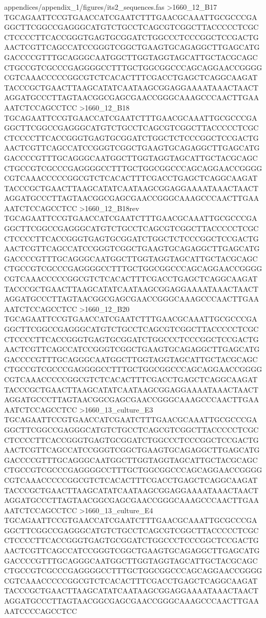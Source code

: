 {\begin{filecontents*}{appendices/appendix_1/figures/its2_sequences.fas}
>1660_12_B17
TGCAGAATTCCGTGAACCATCGAATCTTTGAACGCAAATTGCGCCCGAGGCTTCGGCCGAGGGCATGTCTGCCTCAGCGTCGGCTTACCCCCTCGCCTCCCCTTCACCGGGTGAGTGCGGATCTGGCCCTCCCGGCTCCGACTGAACTCGTTCAGCCATCCGGGTCGGCTGAAGTGCAGAGGCTTGAGCATGGACCCCGTTTGCAGGGCAATGGCTTGGTAGGTAGCATTGCTACGCAGCCTGCCGTCGCCCGAGGGGCCTTTGCTGGCGGCCCAGCAGGAACCGGGGCGTCAAACCCCCGGCGTCTCACACTTTCGACCTGAGCTCAGGCAAGATTACCCGCTGAACTTAAGCATATCAATAAGCGGAGGAAAATAAACTAACTAGGATGCCCTTAGTAACGGCGAGCGAACCGGGCAAAGCCCAACTTGAAAATCTCCAGCCTCC
>1660_12_B18
TGCAGAATTCCGTGAACCATCGAATCTTTGAACGCAAATTGCGCCCGAGGCTTCGGCCGAGGGCATGTCTGCCTCAGCGTCGGCTTACCCCCTCGCCTCCCCTTCACCGGGTGAGTGCGGATCTGGCTCTCCCGGCTCCGACTGAACTCGTTCAGCCATCCGGGTCGGCTGAAGTGCAGAGGCTTGAGCATGGACCCCGTTTGCAGGGCAATGGCTTGGTAGGTAGCATTGCTACGCAGCCTGCCGTCGCCCGAGGGGCCTTTGCTGGCGGCCCAGCAGGAACCGGGGCGTCAAACCCCCGGCGTCTCACACTTTCGACCTGAGCTCAGGCAAGATTACCCGCTGAACTTAAGCATATCAATAAGCGGAGGAAAATAAACTAACTAGGATGCCCTTAGTAACGGCGAGCGAACCGGGCAAAGCCCAACTTGAAAATCTCCAGCCTCC
>1660_12_B18rev
TGCAGAATTCCGTGAACCATCGAATCTTTGAACGCAAATTGCGCCCGAGGCTTCGGCCGAGGGCATGTCTGCCTCAGCGTCGGCTTACCCCCTCGCCTCCCCTTCACCGGGTGAGTGCGGATCTGGCTCTCCCGGCTCCGACTGAACTCGTTCAGCCATCCGGGTCGGCTGAAGTGCAGAGGCTTGAGCATGGACCCCGTTTGCAGGGCAATGGCTTGGTAGGTAGCATTGCTACGCAGCCTGCCGTCGCCCGAGGGGCCTTTGCTGGCGGCCCAGCAGGAACCGGGGCGTCAAACCCCCGGCGTCTCACACTTTCGACCTGAGCTCAGGCAAGATTACCCGCTGAACTTAAGCATATCAATAAGCGGAGGAAAATAAACTAACTAGGATGCCCTTAGTAACGGCGAGCGAACCGGGCAAAGCCCAACTTGAAAATCTCCAGCCTCC
>1660_12_B20
TGCAGAATTCCGTGAACCATCGAATCTTTGAACGCAAATTGCGCCCGAGGCTTCGGCCGAGGGCATGTCTGCCTCAGCGTCGGCTTACCCCCTCGCCTCCCCTTCACCGGGTGAGTGCGGATCTGGCCCTCCCGGCTCCGACTGAACTCGTTCAGCCATCCGGGTCGGCTGAAGTGCAGAGGCTTGAGCATGGACCCCGTTTGCAGGGCAATGGCTTGGTAGGTAGCATTGCTACGCAGCCTGCCGTCGCCCGAGGGGCCTTTGCTGGCGGCCCAGCAGGAACCGGGGCGTCAAACCCCCGGCGTCTCACACTTTCGACCTGAGCTCAGGCAAGATTACCCGCTGAACTTAAGCATATCAATAAGCGGAGGAAAATAAACTAACTAGGATGCCCTTAGTAACGGCGAGCGAACCGGGCAAAGCCCAACTTGAAAATCTCCAGCCTCC
>1660_13_culture_E3
TGCAGAATTCCGTGAACCATCGAATCTTTGAACGCAAATTGCGCCCGAGGCTTCGGCCGAGGGCATGTCTGCCTCAGCGTCGGCTTACCCCCTCGCCTCCCCTTCACCGGGTGAGTGCGGATCTGGCCCTCCCGGCTCCGACTGAACTCGTTCAGCCATCCGGGTCGGCTGAAGTGCAGAGGCTTGAGCATGGACCCCGTTTGCAGGGCAATGGCTTGGTAGGTAGCATTGCTACGCAGCCTGCCGTCGCCCGAGGGGCCTTTGCTGGCGGCCCAGCAGGAACCGGGGCGTCAAACCCCCGGCGTCTCACACTTTCGACCTGAGCTCAGGCAAGATTACCCGCTGAACTTAAGCATATCAATAAGCGGAGGAAAATAAACTAACTAGGATGCCCTTAGTAACGGCGAGCGAACCGGGCAAAGCCCAACTTGAAAATCTCCAGCCTCC
>1660_13_culture_E4
TGCAGAATTCCGTGAACCATCGAATCTTTGAACGCAAATTGCGCCCGAGGCTTCGGCCGAGGGCATGTCTGCCTCAGCGTCGGCTTACCCCCTCGCCTCCCCTTCACCGGGTGAGTGCGGATCTGGCCCTCCCGGCTCCGACTGAACTCGTTCAGCCATCCGGGTCGGCTGAAGTGCAGAGGCTTGAGCATGGACCCCGTTTGCAGGGCAATGGCTTGGTAGGTAGCATTGCTACGCAGCCTGCCGTCGCCCGAGGGGCCTTTGCTGGCGGCCCAGCAGGAACCGGGGCGTCAAACCCCCGGCGTCTCACACTTTCGACCTGAGCTCAGGCAAGATTACCCGCTGAACTTAAGCATATCAATAAGCGGAGGAAAATAAACTAACTAGGATGCCCTTAGTAACGGCGAGCGAACCGGGCAAAGCCCAACTTGAAAATCCCCAGCCTCC

\end{filecontents*}}
